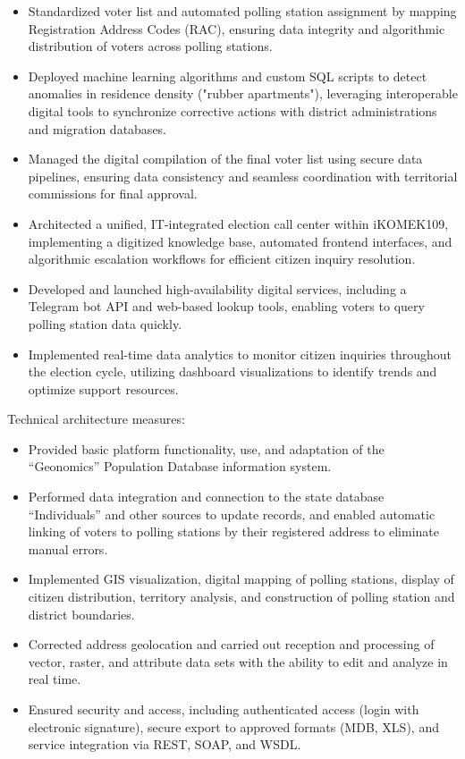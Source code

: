 \begin{itemize}[nosep] \item Standardized voter list and automated polling station assignment by mapping Registration Address Codes (RAC), ensuring data integrity and algorithmic distribution of voters across polling stations. \item Deployed machine learning algorithms and custom SQL scripts to detect anomalies in residence density ("rubber apartments"), leveraging interoperable digital tools to synchronize corrective actions with district administrations and migration databases. \item Managed the digital compilation of the final voter list using secure data pipelines, ensuring data consistency and seamless coordination with territorial commissions for final approval. \item Architected a unified, IT-integrated election call center within iKOMEK109, implementing a digitized knowledge base, automated frontend interfaces, and algorithmic escalation workflows for efficient citizen inquiry resolution. \item Developed and launched high-availability digital services, including a Telegram bot API and web-based lookup tools, enabling voters to query polling station data quickly. \item Implemented real-time data analytics to monitor citizen inquiries throughout the election cycle, utilizing dashboard visualizations to identify trends and optimize support resources. \end{itemize}

Technical architecture measures:

\vspace{-0.5\baselineskip}
\begin{itemize}[nosep]
\item Provided basic platform functionality, use, and adaptation of the ``Geonomics'' Population Database information system.
\item Performed data integration and connection to the state database ``Individuals'' and other sources to update records, and enabled automatic linking of voters to polling stations by their registered address to eliminate manual errors.
\item Implemented GIS visualization, digital mapping of polling stations, display of citizen distribution, territory analysis, and construction of polling station and district boundaries.
\item Corrected address geolocation and carried out reception and processing of vector, raster, and attribute data sets with the ability to edit and analyze in real time.
\item Ensured security and access, including authenticated access (login with electronic signature), secure export to approved formats (MDB, XLS), and service integration via REST, SOAP, and WSDL.
\end{itemize}


